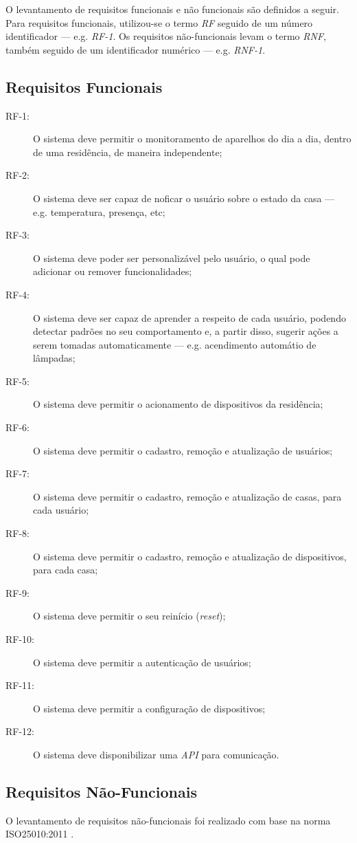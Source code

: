 O levantamento de requisitos funcionais e não funcionais são definidos a seguir. Para requisitos funcionais, utilizou-se o termo \emph{RF} seguido de um número identificador --- e.g. \emph{RF-1}. Os requisitos não-funcionais levam o termo \emph{RNF}, também seguido de um identificador numérico --- e.g. \emph{RNF-1}.

\subsection{Requisitos Funcionais}
\begin{description}
\item[RF-1:] O sistema deve permitir o monitoramento de aparelhos do dia a dia, dentro de uma residência, de maneira independente;
\item[RF-2:] O sistema deve ser capaz de noficar o usuário sobre o estado da casa --- e.g. temperatura, presença, etc;
\item[RF-3:] O sistema deve poder ser personalizável pelo usuário, o qual pode adicionar ou remover funcionalidades;
\item[RF-4:] O sistema deve ser capaz de aprender a respeito de cada usuário, podendo detectar padrões no seu comportamento e, a partir disso, sugerir ações a serem tomadas automaticamente --- e.g. acendimento automátio de lâmpadas;
\item[RF-5:] O sistema deve permitir o acionamento de dispositivos da residência;
\item[RF-6:] O sistema deve permitir o cadastro, remoção e atualização de usuários;
\item[RF-7:] O sistema deve permitir o cadastro, remoção e atualização de casas, para cada usuário;
\item[RF-8:] O sistema deve permitir o cadastro, remoção e atualização de dispositivos, para cada casa;
\item[RF-9:] O sistema deve permitir o seu reinício (\emph{reset});
\item[RF-10:] O sistema deve permitir a autenticação de usuários;
\item[RF-11:] O sistema deve permitir a configuração de dispositivos;
\item[RF-12:] O sistema deve disponibilizar uma \emph{API} para comunicação.

\end{description}

\subsection{Requisitos Não-Funcionais}
O levantamento de requisitos não-funcionais foi realizado com base na norma ISO25010:2011 \cite{iso25010}.

